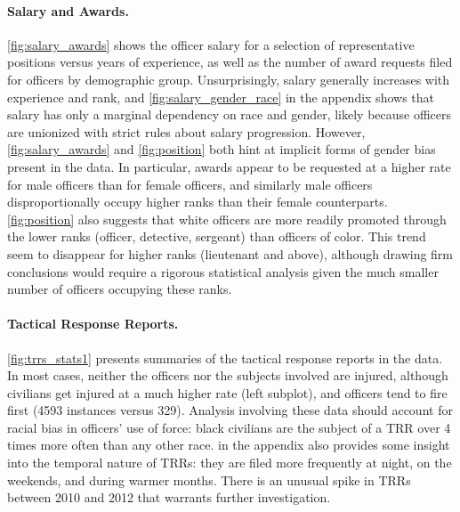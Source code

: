 \paragraph{Salary and Awards.}
\cref{fig:salary_awards} shows the officer salary for a selection of
representative positions versus years of experience, as well as the number of
award requests filed for officers by demographic group.  Unsurprisingly, salary
generally increases with experience and rank, and \cref{fig:salary_gender_race}
in the appendix shows that salary has only a marginal dependency on race and
gender, likely because officers are unionized with strict rules about salary
progression. However, \cref{fig:salary_awards} and \cref{fig:position} both
hint at implicit forms of gender bias present in the data. In particular,
awards appear to be requested at a higher rate for male officers than for
female officers, and similarly male officers disproportionally occupy higher
ranks than their female counterparts. \cref{fig:position} also suggests that
white officers are more readily promoted through the lower ranks (officer,
detective, sergeant) than officers of color.  This trend seem to disappear for
higher ranks (lieutenant and above), although drawing firm conclusions would
require a rigorous statistical analysis given the much smaller number of
officers occupying these ranks.

\paragraph{Tactical Response Reports.}
\cref{fig:trrs_stats1} presents summaries of the tactical response reports in
the data.  In most cases, neither the officers nor the subjects involved are
injured, although civilians get injured at a much higher rate (left subplot),
and officers tend to fire first (4593 instances versus 329).  Analysis
involving these data should account for racial bias in officers' use of force:
black civilians are the subject of a TRR over 4 times more often than any other
race.  in the appendix also provides some insight into the
temporal nature of TRRs: they are filed more frequently at night, on the
weekends, and during warmer months. There is an unusual spike in TRRs between
2010 and 2012 that warrants further investigation.





